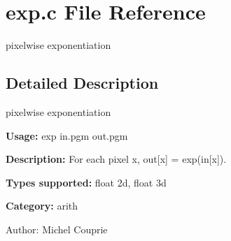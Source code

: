 \section{exp.c File Reference}
\label{exp_8c}
pixelwise exponentiation  




\label{_details}
\subsection{Detailed Description}
pixelwise exponentiation 

{\bf Usage:} exp in.pgm out.pgm

{\bf Description:} For each pixel x, out[x] = exp(in[x]).

{\bf Types supported:} float 2d, float 3d

{\bf Category:} arith

\begin{Desc}
\item[Author:]Michel Couprie \end{Desc}
